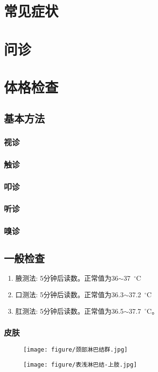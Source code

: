 \documentclass[UTF8]{ctexbook}
\begin{document}
\part{常见症状}
\part{问诊}
\part{体格检查}

\chapter{基本方法}
\section{视诊}
\section{触诊}
\section{叩诊}
\section{听诊}
\section{嗅诊}

\chapter{一般检查}
\begin{enumerate}[(1)]
    \item 腋测法: 5分钟后读数。正常值为36$\sim$37~$^{\circ}$C
    \item 口测法: 5分钟后读数。正常值为36.3$\sim$37.2~$^{\circ}$C
    \item 肛测法: 5分钟后读数。正常值为36.5$\sim$37.7~$^{\circ}$C。
\end{enumerate}

\section{皮肤}
\begin{figure}[htbp]
    \centering
    \texttt{[image: figure/颈部淋巴结群.jpg]}
\end{figure}
\begin{figure}[htbp]
    \centering
    \texttt{[image: figure/表浅淋巴结-上肢.jpg]}
\end{figure}
\end{document}
